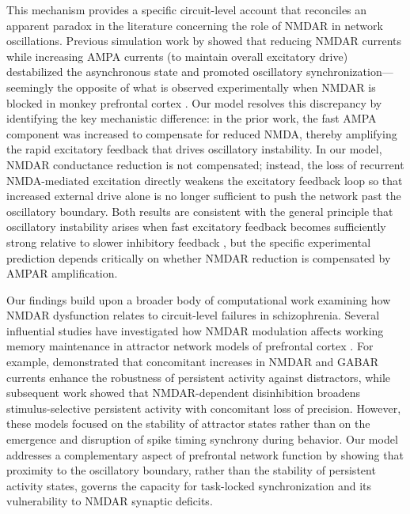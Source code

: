 \documentclass[10pt]{article}
\begin{document}
This mechanism provides a specific circuit-level account that reconciles an apparent paradox in the literature concerning the role of NMDAR in network oscillations. Previous simulation work by \citet{compte2000synaptic} showed that reducing NMDAR currents while increasing AMPA currents (to maintain overall excitatory drive) destabilized the asynchronous state and promoted oscillatory synchronization---seemingly the opposite of what is observed experimentally when NMDAR is blocked in monkey prefrontal cortex \citep{zick2018blocking}. Our model resolves this discrepancy by identifying the key mechanistic difference: in the prior work, the fast AMPA component was increased to compensate for reduced NMDA, thereby amplifying the rapid excitatory feedback that drives oscillatory instability. In our model, NMDAR conductance reduction is not compensated; instead, the loss of recurrent NMDA-mediated excitation directly weakens the excitatory feedback loop so that increased external drive alone is no longer sufficient to push the network past the oscillatory boundary. Both results are consistent with the general principle that oscillatory instability arises when fast excitatory feedback becomes sufficiently strong relative to slower inhibitory feedback \citep{wang1999synaptic}, but the specific experimental prediction depends critically on whether NMDAR reduction is compensated by AMPAR amplification.

Our findings build upon a broader body of computational work examining how NMDAR dysfunction relates to circuit-level failures in schizophrenia. Several influential studies have investigated how NMDAR modulation affects working memory maintenance in attractor network models of prefrontal cortex \citep{compte2000synaptic, wang1999synaptic, brunel2001effects}. For example, \citet{compte2000synaptic} demonstrated that concomitant increases in NMDAR and GABAR currents enhance the robustness of persistent activity against distractors, while subsequent work showed that NMDAR-dependent disinhibition broadens stimulus-selective persistent activity with concomitant loss of precision. However, these models focused on the stability of attractor states rather than on the emergence and disruption of spike timing synchrony during behavior. Our model addresses a complementary aspect of prefrontal network function by showing that proximity to the oscillatory boundary, rather than the stability of persistent activity states, governs the capacity for task-locked synchronization and its vulnerability to NMDAR synaptic deficits.
\end{document}
